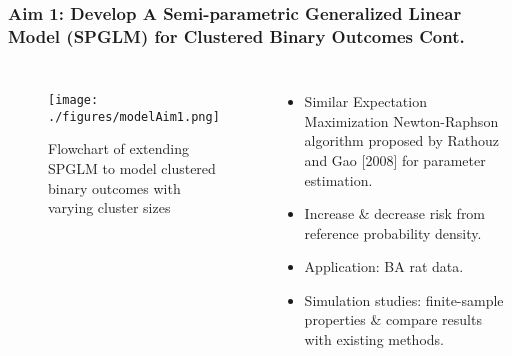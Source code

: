 \documentclass[hyperref={bookmarks=false},aspectratio=169]{beamer}
\begin{document}
\begin{frame}
\frametitle{Aim 1: Develop A Semi-parametric Generalized Linear Model (SPGLM) for Clustered Binary Outcomes Cont.}

\begin{columns}


\begin{figure}
    \centering
    \texttt{[image: ./figures/modelAim1.png]}
    \caption{Flowchart of extending SPGLM to model clustered binary outcomes with varying cluster sizes}
    \label{fig:Aim13}
\end{figure}

\begin{itemize}
    \item Similar Expectation Maximization Newton-Raphson algorithm proposed by Rathouz and Gao [2008] for parameter estimation.
    \item Increase {\&} decrease risk from reference probability density.
    \item Application: BA rat data.
    \item Simulation studies: finite-sample properties {\&} compare results with existing methods.
\end{itemize}

\end{columns}
\end{frame}
\end{document}
